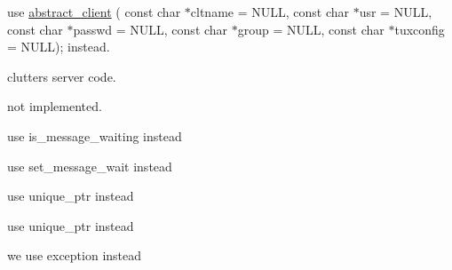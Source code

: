 
\begin{DoxyRefList}
\item[\label{deprecated__deprecated000007}%
\hypertarget{deprecated__deprecated000007}{}%
Member \hyperlink{classatmi_1_1abstract__client_ad6ca32ce6f7b63fc610b5bcbaf6e81ff}{atmi\+:\+:abstract\+\_\+client\+:\+:abstract\+\_\+client} (bool multicontext, const char $\ast$cltname=N\+U\+L\+L, const char $\ast$usr=N\+U\+L\+L, const char $\ast$passwd=N\+U\+L\+L, const char $\ast$group=N\+U\+L\+L)]use \hyperlink{classatmi_1_1abstract__client}{abstract\+\_\+client} ( const char $\ast$cltname = N\+U\+L\+L, const char $\ast$usr = N\+U\+L\+L, const char $\ast$passwd = N\+U\+L\+L, const char $\ast$group = N\+U\+L\+L, const char $\ast$tuxconfig = N\+U\+L\+L); instead.  
\item[\label{deprecated__deprecated000008}%
\hypertarget{deprecated__deprecated000008}{}%
Member \hyperlink{classatmi_1_1abstract__client_a090bac30edb1055da2a0c980167bfe19}{atmi\+:\+:abstract\+\_\+client\+:\+:run} (int argc, char $\ast$$\ast$argv)]
\item[\label{deprecated__deprecated000005}%
\hypertarget{deprecated__deprecated000005}{}%
Class \hyperlink{classatmi_1_1abstract__server}{atmi\+:\+:abstract\+\_\+server} ]clutters server code.  
\item[\label{deprecated__deprecated000001}%
\hypertarget{deprecated__deprecated000001}{}%
Member \hyperlink{classatmi_1_1buffer_a1122406dbbcb04c7ddd5bafbcb6c6f5c}{atmi\+:\+:buffer\+:\+:append} (field $\ast$f)]not implemented.  
\item[\label{deprecated__deprecated000010}%
\hypertarget{deprecated__deprecated000010}{}%
Member \hyperlink{classatmi_1_1queue_a90f5a71979755634b1e625d45ac61412}{atmi\+:\+:queue\+:\+:is\+Q\+Waiting} ()]use is\+\_\+message\+\_\+waiting instead  
\item[\label{deprecated__deprecated000009}%
\hypertarget{deprecated__deprecated000009}{}%
Member \hyperlink{classatmi_1_1queue_a223fac7945fb8d87f04189aa77ce666a}{atmi\+:\+:queue\+:\+:set\+Q\+Wait} (bool wait)]use set\+\_\+message\+\_\+wait instead  
\item[\label{deprecated__deprecated000004}%
\hypertarget{deprecated__deprecated000004}{}%
Member \hyperlink{group__atmi_gaf8c3e342d908ddc295b73c376b7515ca}{atmi\+:\+:queue\+\_\+ptr} ]use unique\+\_\+ptr instead  
\item[\label{deprecated__deprecated000003}%
\hypertarget{deprecated__deprecated000003}{}%
Member \hyperlink{group__atmi_gafc1ae4cdb2829f98c37f27b472fcb867}{atmi\+:\+:transaction\+\_\+ptr} ]use unique\+\_\+ptr instead  
\item[\label{deprecated__deprecated000006}%
\hypertarget{deprecated__deprecated000006}{}%
Member \hyperlink{classatmi_1_1tuxedo_a1c1d7f2df43e4357788d03977548ac2e}{atmi\+:\+:tuxedo\+:\+:update\+Errno} ()]we use exception instead 
\end{DoxyRefList}